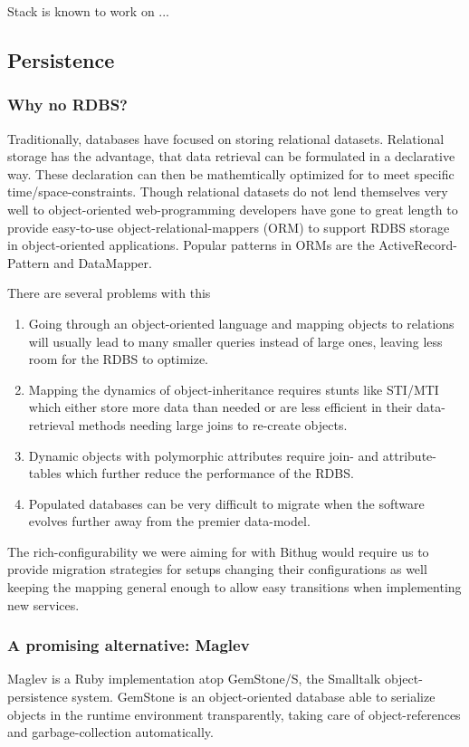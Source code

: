 \documentclass{llncs}
\begin{document}
Stack is known to work on ...

\subsection{Persistence}
\subsubsection{Why no RDBS?}
Traditionally, databases have focused on storing relational datasets. 
Relational storage has the advantage, that data retrieval can be formulated in 
a declarative way. These declaration can then be mathemtically optimized for 
to meet specific time/space-constraints.
Though relational datasets do not lend themselves very well to object-oriented 
web-programming developers have gone to great length to provide easy-to-use 
object-relational-mappers (ORM) to support RDBS storage in object-oriented 
applications. Popular patterns in ORMs are the ActiveRecord-Pattern\cite{citation needed} 
and DataMapper\cite{citation-needed}.

There are several problems with this
\begin{enumerate}
  \item Going through an object-oriented language and mapping objects to 
    relations will usually lead to many smaller queries instead of large 
    ones, leaving less room for the RDBS to optimize. 
  \item Mapping the dynamics of object-inheritance requires stunts like 
    STI/MTI which either store more data than needed or are less efficient in 
    their data-retrieval methods needing large joins to re-create objects.
  \item Dynamic objects with polymorphic attributes require join- and 
    attribute-tables which further reduce the performance of the RDBS.
  \item Populated databases can be very difficult to migrate when the software 
    evolves further away from the premier data-model.
\end{enumerate}

The rich-configurability we were aiming for with Bithug would require us to 
provide migration strategies for setups changing their configurations as well 
keeping the mapping general enough to allow easy transitions when implementing 
new services.
\subsubsection{A promising alternative: Maglev}
Maglev is a Ruby implementation atop GemStone/S, the Smalltalk 
object-persistence system. GemStone is an object-oriented database able to 
serialize objects in the runtime environment transparently, taking care of 
object-references and garbage-collection automatically.
\end{document}
